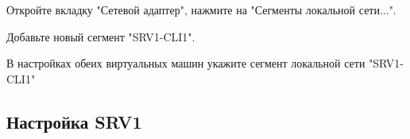 \documentclass[a4paper, 12pt]{report}
\begin{document}
	\clearpage

	Откройте вкладку "Сетевой адаптер", нажмите на "Сегменты локальной сети...".

	\begin{figure}[h]
		\label{fig:image}
	\end{figure}

	\clearpage

	Добавьте новый сегмент "SRV1-CLI1".
	
	\begin{figure}[h]
		\label{fig:image}
	\end{figure}

	В настройках обеих виртуальных машин укажите сегмент локальной сети "SRV1-CLI1"
	
	\begin{figure}[h]
		\label{fig:image}
	\end{figure}
	
	\subsection{Настройка SRV1}
\end{document}

